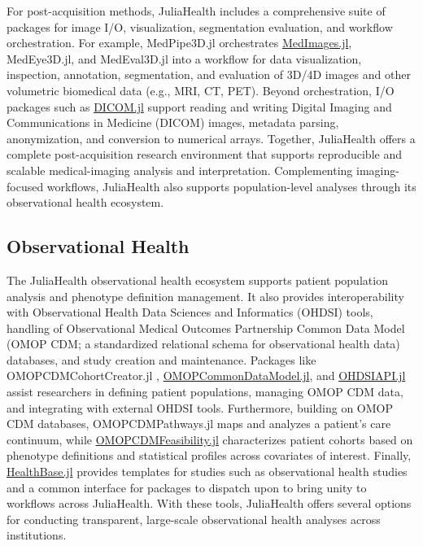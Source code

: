 \documentclass{juliacon}
\begin{document}
For post-acquisition methods, JuliaHealth includes a comprehensive suite of packages for image I/O, visualization, segmentation evaluation, and workflow orchestration.
For example, MedPipe3D.jl \cite{Mitura2021} orchestrates \href{https://github.com/JuliaHealth/MedImages.jl}{MedImages.jl}, MedEye3D.jl, and MedEval3D.jl into a workflow for data visualization, inspection, annotation, segmentation, and evaluation of 3D/4D images and other volumetric biomedical data (e.g., MRI, CT, PET).
Beyond orchestration, I/O packages such as \href{https://github.com/JuliaHealth/DICOM.jl}{DICOM.jl} support reading and writing Digital Imaging and Communications in Medicine (DICOM) images, metadata parsing, anonymization, and conversion to numerical arrays.
Together, JuliaHealth offers a complete post-acquisition research environment that supports reproducible and scalable medical-imaging analysis and interpretation.
Complementing imaging-focused workflows, JuliaHealth also supports population-level analyses through its observational health ecosystem.

\subsection{Observational Health}

The JuliaHealth observational health ecosystem supports patient population analysis and phenotype definition management.
It also provides interoperability with Observational Health Data Sciences and Informatics (OHDSI) tools, handling of Observational Medical Outcomes Partnership Common Data Model (OMOP CDM; a standardized relational schema for observational health data) databases, and study creation and maintenance.
Packages like OMOPCDMCohortCreator.jl \cite{Zelko_OMOPCDMCohortCreator_0_2_0_2022}, \href{https://github.com/JuliaHealth/OMOPCommonDataModel.jl}{OMOPCommonDataModel.jl}, and \href{https://github.com/JuliaHealth/OHDSIAPI.jl}{OHDSIAPI.jl} assist researchers in defining patient populations, managing OMOP CDM data, and integrating with external OHDSI tools.
Furthermore, building on OMOP CDM databases, OMOPCDMPathways.jl \cite{OMOPCDMPathways.jl} maps and analyzes a patient's care continuum, while \href{https://github.com/JuliaHealth/OMOPCDMFeasibility.jl}{OMOPCDMFeasibility.jl} characterizes patient cohorts based on phenotype definitions and statistical profiles across covariates of interest.
Finally, \href{https://github.com/JuliaHealth/HealthBase.jl}{HealthBase.jl} provides templates for studies such as observational health studies and a common interface for packages to dispatch upon to bring unity to workflows across JuliaHealth.
With these tools, JuliaHealth offers several options for conducting transparent, large-scale observational health analyses across institutions.
\end{document}
